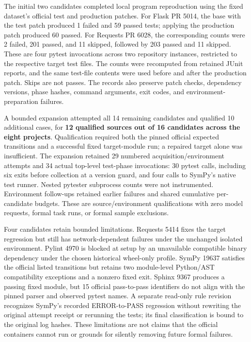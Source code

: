 The initial two candidates completed local program reproduction using
the fixed dataset's official test and production patches. For Flask PR
5014, the base with the test patch produced 1 failed and 59 passed
tests; applying the production patch produced 60 passed. For Requests PR
6028, the corresponding counts were 2 failed, 201 passed, and 11
skipped, followed by 203 passed and 11 skipped. These are four pytest
invocations across two repository instances, restricted to the
respective target test files. The counts were recomputed from retained
JUnit reports, and the same test-file contents were used before and
after the production patch. Skips are not passes. The records also
preserve patch checks, dependency versions, phase hashes, command
arguments, exit codes, and environment-preparation failures.

A bounded expansion attempted all 14 remaining candidates and qualified
10 additional cases, for \textbf{12 qualified sources out of 16
candidates across the eight projects}. Qualification required both the
pinned official expected transitions and a successful fixed
target-module run; a repaired target alone was insufficient. The
expansion retained 29 numbered acquisition/environment attempts and 34
actual top-level test-phase invocations: 30 pytest calls, including six
exits before collection at a version guard, and four calls to SymPy's
native test runner. Nested pytester subprocess counts were not
instrumented. Environment follow-ups retained earlier failures and
shared cumulative per-candidate budgets. These are source/environment
qualifications with zero model requests, formal task runs, or formal
sample exclusions.

Four candidates retain bounded limitations. Requests 5414 fixes the
target regression but still has network-dependent failures under the
unchanged isolated environment. Pylint 4970 is blocked at setup by an
unavailable compatible binary dependency under the chosen historical
wheel-only profile. SymPy 19637 satisfies the official listed
transitions but retains two module-level Python/AST compatibility
exceptions and a nonzero fixed exit. Sphinx 9367 produces a passing
fixed module, but 15 official pass-to-pass identifiers do not align with
the pinned parser and observed pytest names. A separate read-only rule
revision recognizes SymPy's recorded ERROR-to-PASS regression without
rewriting the original attempt receipt or rerunning the tests; its final
classification is bound to the original log hashes. These limitations
are not claims that the official containers cannot run or grounds for
silently removing future formal failures.

